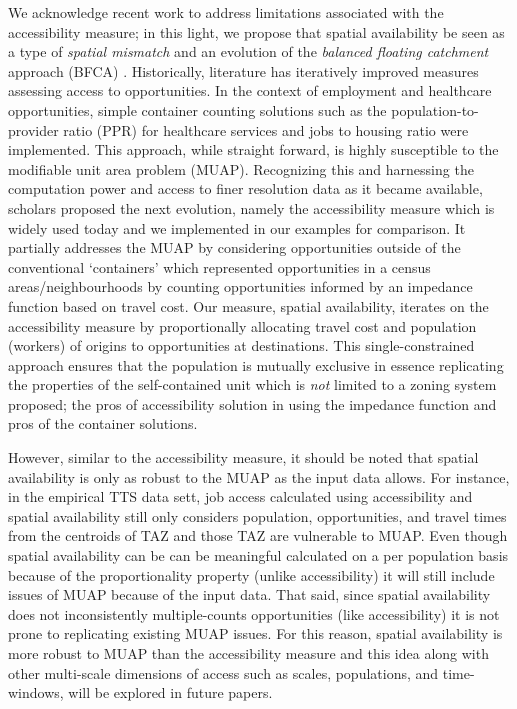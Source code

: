 \documentclass[]{elsarticle} %
\begin{document}
We acknowledge recent work to address limitations associated with the
accessibility measure; in this light, we propose that spatial
availability be seen as a type of \emph{spatial mismatch} and an
evolution of the \emph{balanced floating catchment} approach (BFCA) .
Historically, literature has iteratively improved measures assessing
access to opportunities. In the context of employment and healthcare
opportunities, simple container counting solutions such as the
population-to-provider ratio (PPR) for healthcare services and jobs to
housing ratio were implemented. This approach, while straight forward,
is highly susceptible to the modifiable unit area problem (MUAP).
Recognizing this and harnessing the computation power and access to
finer resolution data as it became available, scholars proposed the next
evolution, namely the accessibility measure which is widely used today
and we implemented in our examples for comparison. It partially
addresses the MUAP by considering opportunities outside of the
conventional `containers' which represented opportunities in a census
areas/neighbourhoods by counting opportunities informed by an impedance
function based on travel cost. Our measure, spatial availability,
iterates on the accessibility measure by proportionally allocating
travel cost and population (workers) of origins to opportunities at
destinations. This single-constrained approach ensures that the
population is mutually exclusive in essence replicating the properties
of the self-contained unit which is \emph{not} limited to a zoning
system proposed; the pros of accessibility solution in using the
impedance function and pros of the container solutions.

However, similar to the accessibility measure, it should be noted that
spatial availability is only as robust to the MUAP as the input data
allows. For instance, in the empirical TTS data sett, job access
calculated using accessibility and spatial availability still only
considers population, opportunities, and travel times from the centroids
of TAZ and those TAZ are vulnerable to MUAP. Even though spatial
availability can be can be meaningful calculated on a per population
basis because of the proportionality property (unlike accessibility) it
will still include issues of MUAP because of the input data. That said,
since spatial availability does not inconsistently multiple-counts
opportunities (like accessibility) it is not prone to replicating
existing MUAP issues. For this reason, spatial availability is more
robust to MUAP than the accessibility measure and this idea along with
other multi-scale dimensions of access such as scales, populations, and
time-windows, will be explored in future papers.
\end{document}
